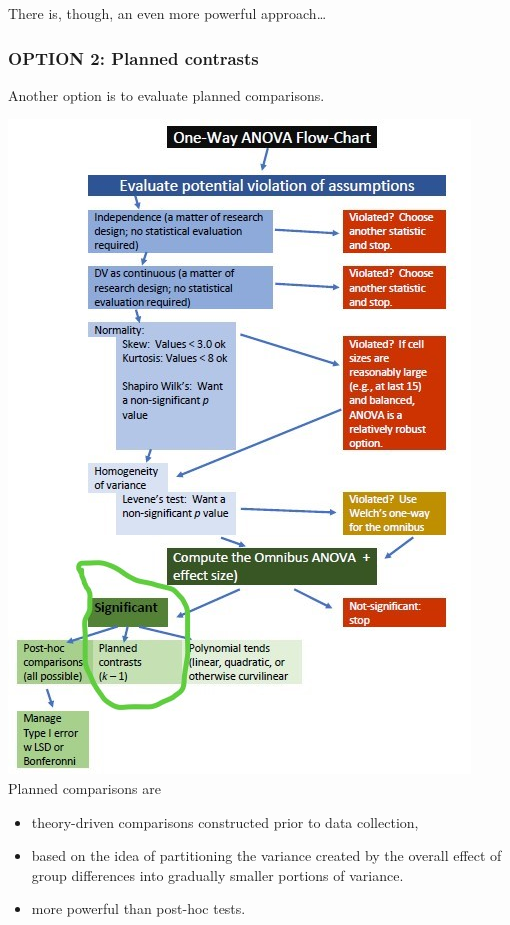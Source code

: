 \documentclass[
  english,
]{book}
\providecommand{\tightlist}{%
  \setlength{\itemsep}{0pt}\setlength{\parskip}{0pt}}
\begin{document}
There is, though, an even more powerful approach\ldots{}

\hypertarget{option-2-planned-contrasts}{%
\subsubsection{OPTION 2: Planned contrasts}\label{option-2-planned-contrasts}}

Another option is to evaluate planned comparisons.

\includegraphics{images/OnewayWrkFlw_planned.jpg}
Planned comparisons are

\begin{itemize}
\tightlist
\item
  theory-driven comparisons constructed prior to data collection,
\item
  based on the idea of partitioning the variance created by the overall effect of group differences into gradually smaller portions of variance.
\item
  more powerful than post-hoc tests.
\end{itemize}
\end{document}
